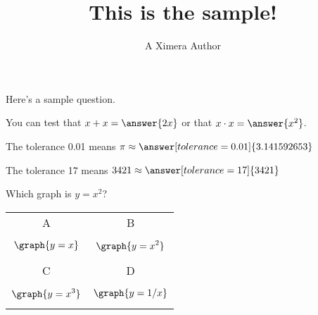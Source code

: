 \documentclass{ximera}
\title{This is the sample!}
\author{A Ximera Author}
\begin{document}
\maketitle

Here's a sample question.

\begin{problem}
\begin{multipleChoice}
\end{multipleChoice}
\end{problem}

\begin{problem}
   You can test that $x + x = \answer{2x}$ or that $x \cdot x = \answer{x^2}$.
\end{problem}

\begin{problem}
   The tolerance 0.01 means $\pi \approx \answer[tolerance=0.01]{3.141592653}$
\end{problem}

\begin{problem}
   The tolerance 17 means $3421 \approx \answer[tolerance=17]{3421}$
\end{problem}

\begin{problem}
    Which graph is $y=x^2$?

\begin{tabular}{cc}
A & B \\
$$\graph{y=x}$$ &$$\graph{y=x^2}$$ \\ \hline
C & D \\
$$\graph{y=x^3}$$ &$$\graph{y=1/x}$$ \\ \hline
\end{tabular}

\begin{multipleChoice}
\end{multipleChoice}
\end{problem}
\end{document}
